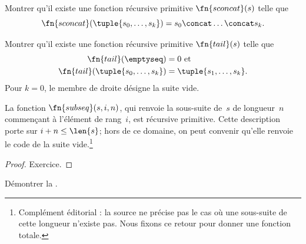 \documentclass[../../../include/open-logic-section]{subfiles}
\begin{document}
\begin{prob}
Montrer qu'il existe une fonction récursive primitive
$\fn{sconcat}(s)$ telle que
\[
\fn{sconcat}(\tuple{s_0, \dots, s_k}) = s_0 \concat \dots \concat s_k.
\]
\end{prob}

\begin{prob}
Montrer qu'il existe une fonction récursive primitive
$\fn{tail}(s)$ telle que
\begin{align*}
  \fn{tail}(\emptyseq) & = 0 \text{ et}\\
  \fn{tail}(\tuple{s_0, \dots, s_{k}}) & = \tuple{s_1, \dots, s_{k}}.
\end{align*}
Pour $k=0$, le membre de droite désigne la suite vide.
\end{prob}

\begin{prop}
  La fonction $\fn{subseq}(s,i,n)$, qui renvoie la
  sous-suite de~$s$ de longueur~$n$ commençant à
  l'élément de rang~$i$, est récursive primitive.
  Cette description porte sur $i+n\leq\len{s}$;
  hors de ce domaine, on peut convenir qu'elle renvoie
  le code de la suite vide.\footnote{Complément éditorial : la source ne précise pas le cas où une sous-suite de cette longueur n'existe pas. Nous fixons ce retour pour donner une fonction totale.}
\end{prop}

\begin{proof}
  Exercice.
\end{proof}

\begin{prob}
  Démontrer la .
\end{prob}
\end{document}
